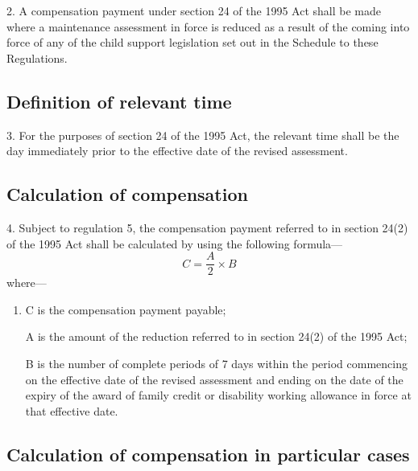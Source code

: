 \documentclass[12pt,a4paper]{article}
\begin{document}
2.  A compensation payment under section 24 of the 1995 Act shall be made where a maintenance assessment in force is reduced as a result of the coming into force of any of the child support legislation set out in the Schedule to these Regulations.

\subsection[3. Definition of relevant time]{Definition of relevant time}

3.  For the purposes of section 24 of the 1995 Act, the relevant time shall be the day immediately prior to the effective date of the revised assessment.

\subsection[4. Calculation of compensation]{Calculation of compensation}

4.  Subject to regulation 5, the compensation payment referred to in section 24(2) of the 1995 Act shall be calculated by using the following formula—
\[C = \frac{A}{2} \times B\]
where—
\begin{enumerate}\item[]
C is the compensation payment payable;

A is the amount of the reduction referred to in section 24(2) of the 1995 Act;

B is the number of complete periods of 7 days within the period commencing on the effective date of the revised assessment and ending on the date of the expiry of the award of family credit or disability working allowance in force at that effective date.
\end{enumerate}

\subsection[5. Calculation of compensation in particular cases]{Calculation of compensation in particular cases}
\end{document}
